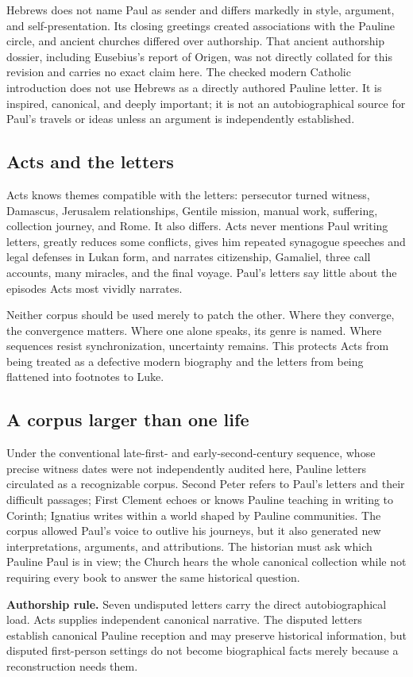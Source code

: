 Hebrews does not name Paul as sender and differs markedly in style, argument,
and self-presentation. Its closing greetings created associations with the
Pauline circle, and ancient churches differed over authorship. That ancient
authorship dossier, including Eusebius's report of Origen, was not directly
collated for this revision and carries no exact claim here. The checked modern
Catholic introduction does not use Hebrews as a directly authored Pauline
letter. It is inspired, canonical, and deeply important; it is not an
autobiographical source for Paul's travels or ideas unless an argument is
independently established.

\subsection{Acts and the letters}

Acts knows themes compatible with the letters: persecutor turned witness,
Damascus, Jerusalem relationships, Gentile mission, manual work, suffering,
collection journey, and Rome. It also differs. Acts never mentions Paul
writing letters, greatly reduces some conflicts, gives him repeated synagogue
speeches and legal defenses in Lukan form, and narrates citizenship, Gamaliel,
three call accounts, many miracles, and the final voyage. Paul's letters say
little about the episodes Acts most vividly narrates.

Neither corpus should be used merely to patch the other. Where they converge,
the convergence matters. Where one alone speaks, its genre is named. Where
sequences resist synchronization, uncertainty remains. This protects Acts
from being treated as a defective modern biography and the letters from being
flattened into footnotes to Luke.

\subsection{A corpus larger than one life}

Under the conventional late-first- and early-second-century sequence, whose
precise witness dates were not independently audited here, Pauline letters
circulated as a recognizable corpus. Second Peter refers to Paul's letters and their difficult
passages; First Clement echoes or knows Pauline teaching in writing to Corinth;
Ignatius writes within a world shaped by Pauline communities. The corpus
allowed Paul's voice to outlive his journeys, but it also generated new
interpretations, arguments, and attributions. The historian must ask which
Pauline Paul is in view; the Church hears the whole canonical collection while
not requiring every book to answer the same historical question.

\begin{studyframe}
\textbf{Authorship rule.} Seven undisputed letters carry the direct
autobiographical load. Acts supplies independent canonical narrative. The
disputed letters establish canonical Pauline reception and may preserve
historical information, but disputed first-person settings do not become
biographical facts merely because a reconstruction needs them.
\end{studyframe}
